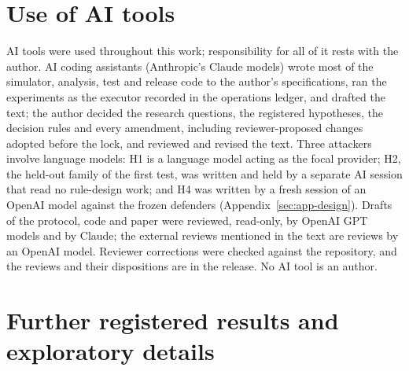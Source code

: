 \documentclass[11pt]{article}
\begin{document}
\section*{Use of AI tools}\label{sec:ai-use}
AI tools were used throughout this work; responsibility for all of it rests with the author. AI coding assistants (Anthropic's Claude models) wrote most of the simulator, analysis, test and release code to the author's specifications, ran the experiments as the executor recorded in the operations ledger, and drafted the text; the author decided the research questions, the registered hypotheses, the decision rules and every amendment, including reviewer-proposed changes adopted before the lock, and reviewed and revised the text. Three attackers involve language models: H1 is a language model acting as the focal provider; H2, the held-out family of the first test, was written and held by a separate AI session that read no rule-design work; and H4 was written by a fresh session of an OpenAI model against the frozen defenders (Appendix~\ref{sec:app-design}). Drafts of the protocol, code and paper were reviewed, read-only, by OpenAI GPT models and by Claude; the external reviews mentioned in the text are reviews by an OpenAI model. Reviewer corrections were checked against the repository, and the reviews and their dispositions are in the release. No AI tool is an author.

\appendix
\FloatBarrier
\section{Further registered results and exploratory details}\label{sec:app-results}
\end{document}

